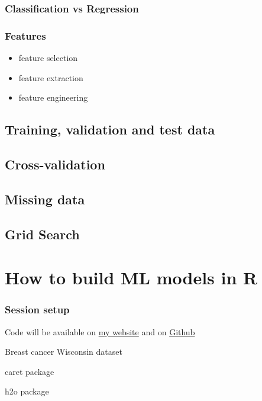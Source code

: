 \documentclass[notes, c, 11pt, xcolor=svgnames, hyperref={colorlinks,citecolor=DeepPink4,linkcolor=DarkRed,urlcolor=DarkBlue}]{beamer}
\begin{document}
\begin{frame}
	\frametitle{Classification vs Regression}

\end{frame}


\begin{frame}
	\frametitle{Features}
	
	\begin{itemize}
		\item feature selection
		\item feature extraction
		\item feature engineering
	\end{itemize}
\end{frame}



\subsection{Training, validation and test data}


\subsection{Cross-validation}

\subsection{Missing data}

\subsection{Grid Search}




\section{How to build ML models in R}

\begin{frame}
	\frametitle{Session setup}
	
	Code will be available on \href{https://shiring.github.io}{my website} and on \href{https://github.com/ShirinG/Webinar_ML_for_disease}{Github}
	
	Breast cancer Wisconsin dataset
	
	caret package
	
	h2o package
\end{frame}
\end{document}
